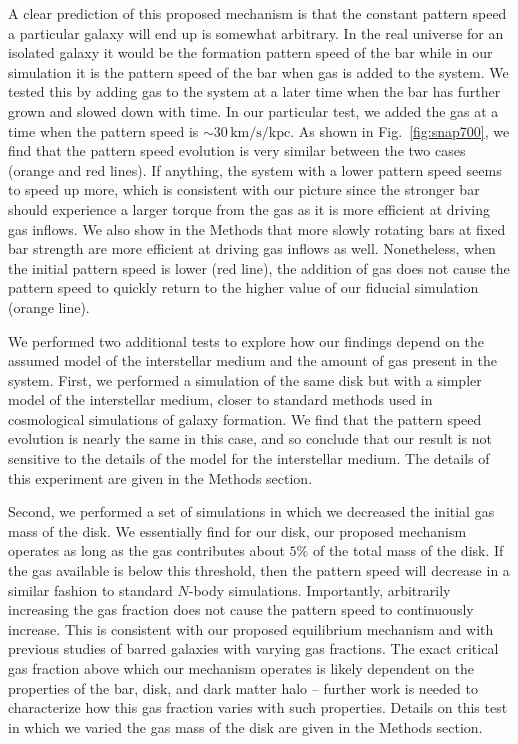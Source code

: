 \documentclass[twoside]{natureprintstyle}
\newcommand{\Nbody}{$N$-body}
\begin{document}
A clear prediction of this proposed mechanism is that the constant pattern
speed a particular galaxy will end up is somewhat arbitrary. In the real
universe for an isolated galaxy it would be the formation pattern speed of the
bar while in our simulation it is the pattern speed of the bar when gas is
added to the system. We tested this by adding gas to the system at a later
time when the bar has further grown and slowed down with time. In our
particular test, we added the gas at a time when the pattern speed is
$\sim30\,\textrm{km}/\textrm{s}/\textrm{kpc}$. As shown in
Fig.~\ref{fig:snap700}, we find that the pattern speed evolution is very
similar between the two cases (orange and red lines). If anything, the system
with a lower pattern speed seems to speed up more, which is consistent with
our picture since the stronger bar should experience a larger torque from the
gas as it is more efficient at driving gas inflows. We also show in the
Methods that more slowly rotating bars at fixed bar strength are more
efficient at driving gas inflows as well. Nonetheless, when the initial pattern
speed is lower (red line), the addition of gas does not cause the pattern
speed to quickly return to the higher value of our fiducial simulation (orange
line).

We performed two additional tests to explore how our findings depend on the
assumed model of the interstellar medium and the amount of gas present in the
system. First, we performed a simulation of the same disk but with a simpler
model of the interstellar medium\cite{2003MNRAS.339..289S}, closer to standard
methods used in cosmological simulations of galaxy formation. We find that the
pattern speed evolution is nearly the same in this case, and so conclude that
our result is not sensitive to the details of the model for the interstellar
medium. The details of this experiment are given in the Methods section.

Second, we performed a set of simulations in which we decreased the initial
gas mass of the disk. We essentially find for our disk, our proposed mechanism
operates as long as the gas contributes about $5\%$ of the total mass of the
disk. If the gas available is below this threshold, then the pattern speed
will decrease in a similar fashion to standard \Nbody{} simulations.
Importantly, arbitrarily increasing the gas fraction does not cause the
pattern speed to continuously increase. This is consistent with our proposed
equilibrium mechanism and with previous studies of barred galaxies with varying gas fractions.\cite{2010ApJ...719.1470V} The exact critical gas
fraction above which our mechanism operates is likely dependent on the
properties of the bar, disk, and dark matter halo -- further work is needed to
characterize how this gas fraction varies with such properties. Details on
this test in which we varied the gas mass of the disk are given in the Methods
section.
\end{document}
